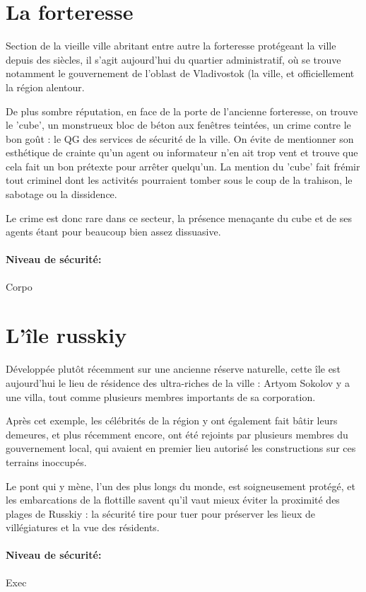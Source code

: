 \documentclass[10pt,a4paper]{book}
\begin{document}
\section{La forteresse}
Section de la vieille ville abritant entre autre la forteresse protégeant la ville depuis des siècles, il s’agit aujourd'hui du quartier administratif, où se trouve notamment le gouvernement de l'oblast de Vladivostok (la ville, et officiellement la région alentour.

De plus sombre réputation, en face de la porte de l'ancienne forteresse, on trouve le 'cube', un monstrueux bloc de béton aux fenêtres teintées, un crime contre le bon goût : le QG des services de sécurité de la ville. On évite de mentionner son esthétique de crainte qu'un agent ou informateur n'en ait trop vent et trouve que cela fait un bon prétexte pour arrêter quelqu'un. La mention du 'cube' fait frémir tout criminel dont les activités pourraient tomber sous le coup de la trahison, le sabotage ou la dissidence.

Le crime est donc rare dans ce secteur, la présence menaçante du cube et de ses agents étant pour beaucoup bien assez dissuasive.
\paragraph{Niveau de sécurité:}Corpo
\section{L'île russkiy}
Développée plutôt récemment sur une ancienne réserve naturelle, cette île est aujourd'hui le lieu de résidence des ultra-riches de la ville : Artyom Sokolov y a une villa, tout comme plusieurs membres importants de sa corporation.

Après cet exemple, les célébrités de la région y ont également fait bâtir leurs demeures, et plus récemment encore, ont été rejoints par plusieurs membres du gouvernement local, qui avaient en premier lieu autorisé les constructions sur ces terrains inoccupés.

Le pont qui y mène, l'un des plus longs du monde, est soigneusement protégé, et les embarcations de la flottille savent qu'il vaut mieux éviter la proximité des plages de Russkiy : la sécurité tire pour tuer pour préserver les lieux de villégiatures et la vue des résidents.
\paragraph{Niveau de sécurité:}Exec
\end{document}
